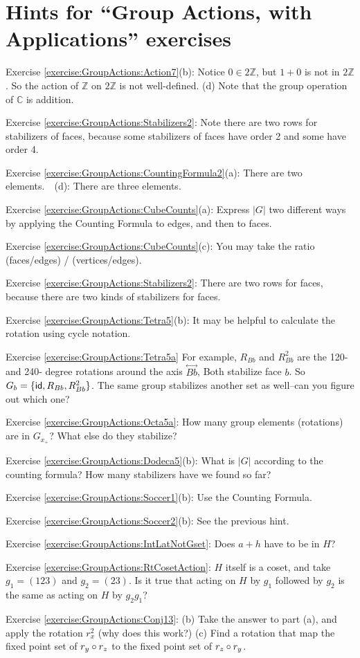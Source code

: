 \section{Hints for ``Group Actions, with Applications'' exercises}
\label{sec:GroupActions:Hints} 


\noindent Exercise \ref{exercise:GroupActions:Action7}(b): Notice $0 \in 2\mathbb{Z}$, but $1+0$ is not in $2\mathbb{Z}$. So the action of $\mathbb{Z}$ on $2\mathbb{Z}$ is not well-defined. (d) Note that the group operation of $\mathbb{C}$ is addition.

\noindent Exercise \ref{exercise:GroupActions:Stabilizers2}: Note there are two rows for stabilizers of faces, because some stabilizers of faces have order 2 and some have order 4.

\noindent Exercise \ref{exercise:GroupActions:CountingFormula2}(a):   There are two elements.~~(d):   There are three elements.

\noindent Exercise \ref{exercise:GroupActions:CubeCounts}(a):   Express $|G|$ two different ways by applying the Counting Formula to edges, and then to faces.

\noindent Exercise \ref{exercise:GroupActions:CubeCounts}(c):  You may take the ratio (faces/edges) / (vertices/edges).

\noindent Exercise \ref{exercise:GroupActions:Stabilizers2}:   There are two rows for faces, because there are two kinds of stabilizers for faces.

\noindent Exercise \ref{exercise:GroupActions:Tetra5}(b): It may be helpful to calculate the rotation using cycle notation.

\noindent Exercise \ref{exercise:GroupActions:Tetra5a} For example, $R_{Bb}$ and  $R_{Bb}^2$ are the 120- and 240- degree rotations around the axis $\overset{\leftrightarrow}{Bb}$, Both stabilize face $b$. So 
$G_b = \{ {\sf{i}d}, R_{Bb}, R_{Bb}^2 \}$. The same group stabilizes another set as well--can you figure out which one?  


\noindent Exercise \ref{exercise:GroupActions:Octa5a}: How many group elements (rotations) are in $G_{x_+}$?  What else do they stabilize?

\noindent Exercise \ref{exercise:GroupActions:Dodeca5}(b): What is $|G|$ according to the counting formula?  How many stabilizers have we found so far?

\noindent Exercise \ref{exercise:GroupActions:Soccer1}(b): Use the Counting Formula.

\noindent Exercise \ref{exercise:GroupActions:Soccer2}(b): See the previous hint.

\noindent Exercise \ref{exercise:GroupActions:IntLatNotGset}: Does $a+h$ have to be in $H$?

\noindent Exercise \ref{exercise:GroupActions:RtCosetAction}: $H$ itself is a coset, and take $g_1=(123)$ and $g_2=(23)$.  Is it true that acting on $H$ by $g_1$ followed by $g_2$ is the same as acting on $H$ by $g_2 g_1$?

\noindent Exercise \ref{exercise:GroupActions:Conj13}: (b) Take the answer to part (a), and apply the rotation $r_x^2$ (why does this work?)  (c) Find a rotation that map the fixed point set of $r_y\circ r_z$ to the fixed point set of  $r_z\circ r_y$.
